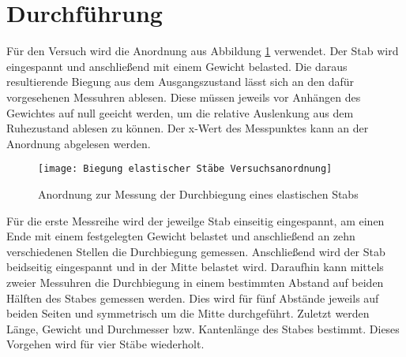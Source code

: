 \section{Durchführung}
Für den Versuch wird die Anordnung aus Abbildung \ref{fig:Aufbau} verwendet. Der Stab wird eingespannt und anschließend mit einem Gewicht belasted. Die daraus 
resultierende Biegung aus dem Ausgangszustand lässt sich an den dafür vorgesehenen Messuhren ablesen. Diese müssen jeweils vor Anhängen des Gewichtes 
auf null geeicht werden, um die relative Auslenkung aus dem Ruhezustand ablesen zu können. Der x-Wert des Messpunktes kann an der Anordnung abgelesen werden. \\
\begin{figure}
\centering
\texttt{[image: Biegung elastischer Stäbe Versuchsanordnung]}
\caption{Anordnung zur Messung der Durchbiegung eines elastischen Stabs}
\label{fig:Aufbau}
\end{figure}
Für die erste Messreihe wird der jeweilge Stab einseitig eingespannt, am einen Ende mit einem festgelegten Gewicht belastet und anschließend an zehn verschiedenen Stellen die Durchbiegung gemessen. Anschließend wird der Stab beidseitig eingespannt und in der Mitte belastet wird. Daraufhin kann mittels zweier Messuhren die Durchbiegung in einem bestimmten Abstand auf beiden Hälften des Stabes gemessen werden. Dies wird für fünf Abstände jeweils auf beiden Seiten und symmetrisch um die Mitte durchgeführt. Zuletzt werden Länge, Gewicht und Durchmesser bzw. Kantenlänge des Stabes bestimmt. Dieses Vorgehen wird für vier Stäbe wiederholt.
